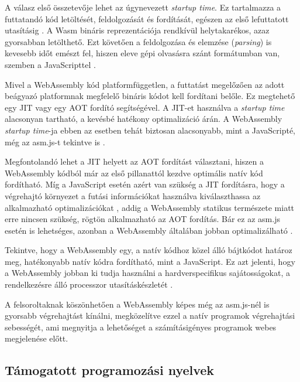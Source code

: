 A válasz első összetevője lehet az úgynevezett \textit{startup time}. Ez tartalmazza a futtatandó kód letöltését, feldolgozását és fordítását, egészen az első lefuttatott utasításig \cite{Zakai::WhyWebAssemblyIsFasterThanAsmJs}. A Wasm bináris reprezentációja rendkívül helytakarékos, azaz gyorsabban letölthető. Ezt követően a feldolgozása és elemzése (\textit{parsing}) is kevesebb időt emészt fel, hiszen eleve gépi olvasásra szánt formátumban van, szemben a JavaScripttel \cite{Clark::WhatMakesWebAssemblyFast}.

Mivel a WebAssembly kód platformfüggetlen, a futtatást megelőzően az adott beágyazó platformnak megfelelő bináris kódot kell fordítani belőle. Ez megtehető egy JIT vagy egy AOT fordító segítségével. A JIT-et használva a \textit{startup time} alacsonyan tartható, a kevésbé hatékony optimalizáció árán. A WebAssembly \textit{startup time}-ja ebben az esetben tehát biztosan alacsonyabb, mint a JavaScripté, még az asm.js-t tekintve is \cite{Zakai::WhyWebAssemblyIsFasterThanAsmJs}. 

Megfontolandó lehet a JIT helyett az AOT fordítást választani, hiszen a WebAssembly kódból már az első pillanattól kezdve optimális natív kód fordítható. Míg a JavaScript esetén azért van szükség a JIT fordításra, hogy a végrehajtó környezet a futási információkat használva kiválaszthassa az alkalmazható optimalizációkat \cite{Clark::ACrashCourseInJustInTimeCompilers}, addig a WebAssembly statikus természete miatt erre nincsen szükség, rögtön alkalmazható az AOT fordítás. Bár ez az asm.js esetén is lehetséges, azonban a WebAssembly általában jobban optimalizálható \cite{Zakai::WhyWebAssemblyIsFasterThanAsmJs}.

Tekintve, hogy a WebAssembly egy, a natív kódhoz közel álló  bájtkódot határoz meg, hatékonyabb natív kódra fordítható, mint a JavaScript. Ez azt jelenti, hogy a WebAssembly jobban ki tudja használni a hardverspecifikus sajátosságokat, a rendelkezésre álló processzor utasításkészletét \cite{Zakai::WhyWebAssemblyIsFasterThanAsmJs}.

A felsoroltaknak köszönhetően a WebAssembly képes még az asm.js-nél is gyorsabb végrehajtást kínálni, megközelítve ezzel a natív programok végrehajtási sebességét, ami megnyitja a lehetőséget a számításigényes programok webes megjelenése előtt.

\subsection{Támogatott programozási nyelvek}

